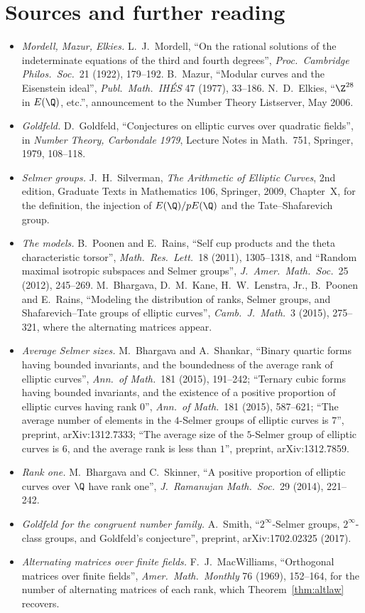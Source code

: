 \section*{Sources and further reading}

\begin{itemize}
\item \emph{Mordell, Mazur, Elkies.} L.~J.~Mordell, ``On the rational solutions of the indeterminate equations of the third and fourth degrees'', \emph{Proc.\ Cambridge Philos.\ Soc.}\ 21 (1922), 179--192. B.~Mazur, ``Modular curves and the Eisenstein ideal'', \emph{Publ.\ Math.\ IHÉS} 47 (1977), 33--186. N.~D.~Elkies, ``$\Z^{28}$ in $E(\Q)$, etc.'', announcement to the Number Theory Listserver, May 2006.
\item \emph{Goldfeld.} D.~Goldfeld, ``Conjectures on elliptic curves over quadratic fields'', in \emph{Number Theory, Carbondale 1979}, Lecture Notes in Math.\ 751, Springer, 1979, 108--118.
\item \emph{Selmer groups.} J.~H.~Silverman, \emph{The Arithmetic of Elliptic Curves}, 2nd edition, Graduate Texts in Mathematics 106, Springer, 2009, Chapter~X, for the definition, the injection of $E(\Q)/pE(\Q)$ and the Tate--Shafarevich group.
\item \emph{The models.} B.~Poonen and E.~Rains, ``Self cup products and the theta characteristic torsor'', \emph{Math.\ Res.\ Lett.}\ 18 (2011), 1305--1318, and ``Random maximal isotropic subspaces and Selmer groups'', \emph{J.\ Amer.\ Math.\ Soc.}\ 25 (2012), 245--269. M.~Bhargava, D.~M.~Kane, H.~W.~Lenstra, Jr., B.~Poonen and E.~Rains, ``Modeling the distribution of ranks, Selmer groups, and Shafarevich--Tate groups of elliptic curves'', \emph{Camb.\ J.\ Math.}\ 3 (2015), 275--321, where the alternating matrices appear.
\item \emph{Average Selmer sizes.} M.~Bhargava and A.~Shankar, ``Binary quartic forms having bounded invariants, and the boundedness of the average rank of elliptic curves'', \emph{Ann.\ of Math.}\ 181 (2015), 191--242; ``Ternary cubic forms having bounded invariants, and the existence of a positive proportion of elliptic curves having rank $0$'', \emph{Ann.\ of Math.}\ 181 (2015), 587--621; ``The average number of elements in the $4$-Selmer groups of elliptic curves is $7$'', preprint, arXiv:1312.7333; ``The average size of the $5$-Selmer group of elliptic curves is $6$, and the average rank is less than $1$'', preprint, arXiv:1312.7859.
\item \emph{Rank one.} M.~Bhargava and C.~Skinner, ``A positive proportion of elliptic curves over $\Q$ have rank one'', \emph{J.\ Ramanujan Math.\ Soc.}\ 29 (2014), 221--242.
\item \emph{Goldfeld for the congruent number family.} A.~Smith, ``$2^\infty$-Selmer groups, $2^\infty$-class groups, and Goldfeld's conjecture'', preprint, arXiv:1702.02325 (2017).
\item \emph{Alternating matrices over finite fields.} F.~J.~MacWilliams, ``Orthogonal matrices over finite fields'', \emph{Amer.\ Math.\ Monthly} 76 (1969), 152--164, for the number of alternating matrices of each rank, which Theorem~\ref{thm:altlaw} recovers.
\end{itemize}
